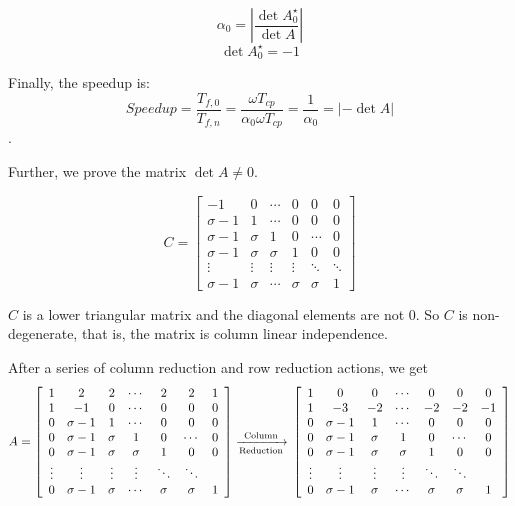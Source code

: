 $$\alpha_{0} = \left |\frac{\det A^{\star}_{0}}{\det A} \right |$$
$$\det A^{\star}_{0} = -1$$

Finally, the speedup is:
$$Speedup = \frac{T_{f, 0}}{T_{f, n}}= \frac{\omega T_{cp}}{\alpha_{0}\omega T_{cp}} = \frac{1}{\alpha_{0}} =  \left|-\det A\right|$$.

Further, we prove the matrix $\det A \neq 0$. 
\renewcommand{\qedsymbol}{$\blacksquare$}

\begin{equation}
{
C = \left[ \begin{array}{cccccc}
-1 & 0 & \cdots& 0 & 0 & 0\\
\sigma-1 & 1 & \cdots & 0 & 0 & 0 \\
\sigma-1 & \sigma & 1 & 0 & \cdots & 0 \\
\sigma-1 & \sigma & \sigma & 1 & 0 & 0 \\
\vdots & \vdots & \vdots  &   \vdots & \ddots & \ddots\\
\sigma-1 & \sigma & \cdots & \sigma & \sigma & 1
\end{array} 
\right ]
}
\end{equation}

$C$ is a lower triangular matrix and the diagonal elements are not $0$.  So $C$ is non-degenerate, that is, the matrix is column linear independence.

After a series of column reduction and row reduction actions, we get
\begin{equation*}
     {A = \left[ \begin{array}{ccccccc}
1 & 2 & 2 & \cdots & 2 & 2 & 1\\
1 & -1 & 0 & \cdots& 0 & 0 & 0\\
0 & \sigma-1 & 1 & \cdots & 0 & 0 & 0 \\
0 & \sigma-1 & \sigma & 1 & 0 & \cdots & 0 \\
0 & \sigma-1 & \sigma & \sigma & 1 & 0 & 0 \\
\vdots & \vdots & \vdots  &   \vdots & \ddots & \ddots\\
0 & \sigma-1 & \sigma & \cdots & \sigma & \sigma & 1
\end{array} 
\right ]
\xrightarrow[\text{Reduction}]{\text{Column}}\\
\left[ \begin{array}{ccccccc}
1 & 0 & 0 & \cdots & 0 & 0 & 0\\
1 & -3 & -2 & \cdots& -2 & -2 & -1\\
0 & \sigma-1 & 1 & \cdots & 0 & 0 & 0 \\
0 & \sigma-1 & \sigma & 1 & 0 & \cdots & 0 \\
0 & \sigma-1 & \sigma & \sigma & 1 & 0 & 0 \\
\vdots & \vdots & \vdots  &   \vdots & \ddots & \ddots\\
0 & \sigma-1 & \sigma & \cdots & \sigma & \sigma & 1
\end{array} 
\right ]
}
\end{equation*}

